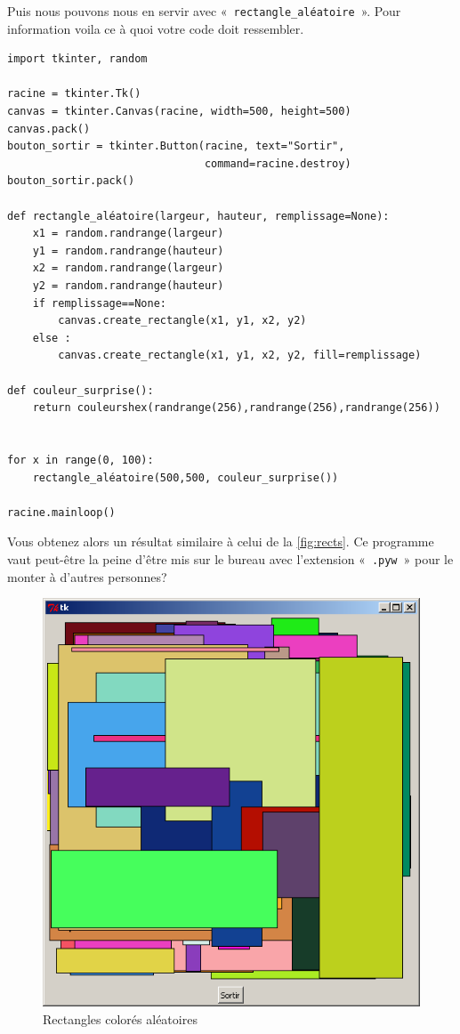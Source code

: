 Puis nous pouvons nous en servir avec « \texttt{rectangle\_aléatoire} ». Pour information voila ce à quoi votre code doit ressembler.

\begin{Verbatim}[frame=single,rulecolor=\color{mbleu}, label=à taper]
import tkinter, random

racine = tkinter.Tk()
canvas = tkinter.Canvas(racine, width=500, height=500)
canvas.pack()
bouton_sortir = tkinter.Button(racine, text="Sortir",
                               command=racine.destroy)
bouton_sortir.pack()

def rectangle_aléatoire(largeur, hauteur, remplissage=None):
    x1 = random.randrange(largeur)
    y1 = random.randrange(hauteur)
    x2 = random.randrange(largeur)
    y2 = random.randrange(hauteur)
    if remplissage==None:
        canvas.create_rectangle(x1, y1, x2, y2)
    else :	
        canvas.create_rectangle(x1, y1, x2, y2, fill=remplissage)

def couleur_surprise():
    return couleurshex(randrange(256),randrange(256),randrange(256))


for x in range(0, 100):
    rectangle_aléatoire(500,500, couleur_surprise())

racine.mainloop()
\end{Verbatim}

Vous obtenez alors un résultat similaire à celui de la \autoref{fig:rects}. Ce programme vaut peut-être la peine d'être mis sur le bureau avec l'extension « \texttt{.pyw} » pour le monter à d'autres personnes?
\begin{figure}[h!]
\centering
\includegraphics[scale=0.4]{images/rectangles2}
\caption{Rectangles colorés aléatoires}\label{fig:rects}
\end{figure}

